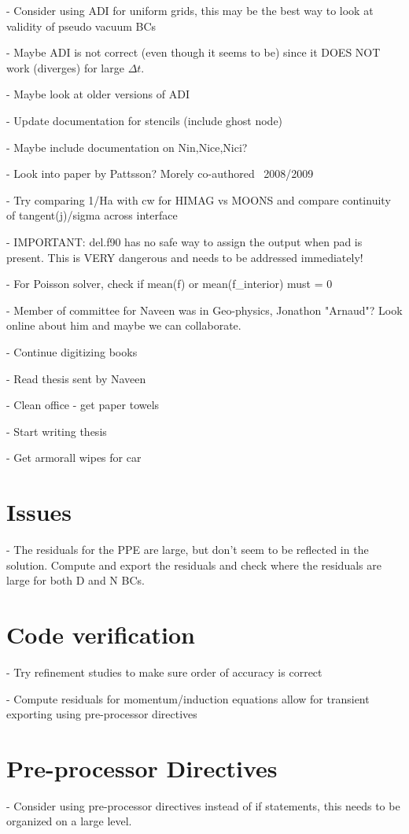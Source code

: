 \documentclass[11pt]{article}
\begin{document}
- Consider using ADI for uniform grids, this may be the best way to look at validity of pseudo vacuum BCs

- Maybe ADI is not correct (even though it seems to be) since it DOES NOT work (diverges) for large $\Delta t$.

- Maybe look at older versions of ADI

- Update documentation for stencils (include ghost node)

- Maybe include documentation on Nin,Nice,Nici?

- Look into paper by Pattsson? Morely co-authored ~2008/2009

- Try comparing 1/Ha with cw for HIMAG vs MOONS and compare continuity of tangent(j)/sigma across interface

- IMPORTANT: del.f90 has no safe way to assign the output when pad is present. This is VERY dangerous and needs to be addressed immediately!

- For Poisson solver, check if mean(f) or mean(f\_interior) must = 0

- Member of committee for Naveen was in Geo-physics, Jonathon "Arnaud"? Look online about him and maybe we can collaborate.

- Continue digitizing books

- Read thesis sent by Naveen

- Clean office - get paper towels

- Start writing thesis

- Get armorall wipes for car

\section{Issues}

- The residuals for the PPE are large, but don't seem to be reflected in the solution. Compute and export the residuals and check where the residuals are large for both D and N BCs.

\section{Code verification}

- Try refinement studies to make sure order of accuracy is correct

- Compute residuals for momentum/induction equations allow for transient exporting using pre-processor directives

\section{Pre-processor Directives}
- Consider using pre-processor directives instead of if statements, this needs to be organized on a large level.
\end{document}
